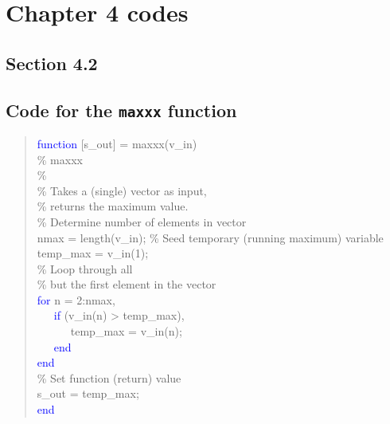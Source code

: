 \documentclass{tufte-book} %
\newenvironment{docspec}{\begin{quotation}\ttfamily\parskip0pt\parindent0pt\ignorespaces}{\end{quotation}}
\begin{document}
%
\newpage


\section{Chapter 4 codes}


\subsection*{\textbf{Section 4.2}}

\subsection*{Code for the \texttt{maxxx} function}

\begin{docspec}
\textcolor{blue}{function} [s\_out] = maxxx(v\_in)\\
\textcolor[rgb]{0,0.501961,0}{\% maxxx\\
\%\\
\% Takes a (single) vector as input, \\ \% returns the maximum value.}\\

\textcolor[rgb]{0,0.501961,0}{\% Determine number of elements in vector}\\
nmax = length(v\_in);
\textcolor[rgb]{0,0.501961,0}{\% Seed temporary (running maximum) variable}\\
temp\_max = v\_in(1);\\
\textcolor[rgb]{0,0.501961,0}{\% Loop through all \\ \% but the first element in the vector}\\
\textcolor{blue}{for} n = 2:nmax,\\
\ \ \ \textcolor{blue}{if} (v\_in(n) > temp\_max),\\
\ \ \ \ \ \ temp\_max = v\_in(n);\\
\ \ \ \textcolor{blue}{end}\\
\textcolor{blue}{end}\\
\textcolor[rgb]{0,0.501961,0}{\% Set function (return) value}\\
s\_out = temp\_max;\\
\textcolor{blue}{end}
\end{docspec}
\end{document}
